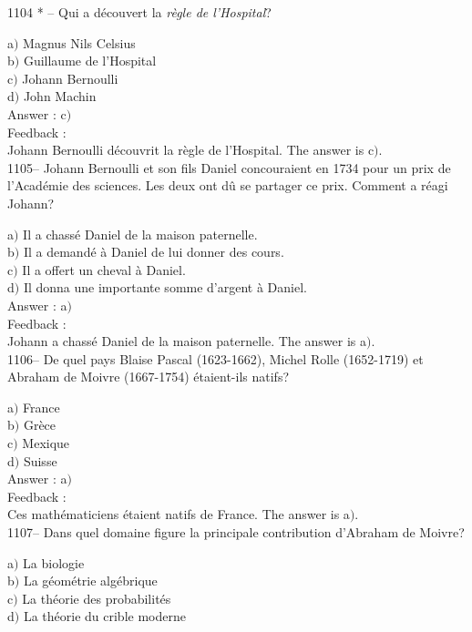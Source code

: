 ﻿\documentclass[letterpaper, 12pt]{article}
\begin{document}
1104 * -- Qui a d\'ecouvert la {\sl r\`egle de l'Hospital}?

a$)$ Magnus Nils Celsius \\
b$)$ Guillaume de l'Hospital \\
c$)$ Johann Bernoulli  \\
d$)$ John Machin  \\

Answer : c$)$\\

Feedback : \\
Johann Bernoulli d\'ecouvrit la r\`egle de l'Hospital.
The answer is c$)$.\\

1105-- Johann Bernoulli et son fils Daniel concouraient en 1734 pour
un prix de l'Acad\'emie des sciences. Les deux ont d\^u se partager
ce prix. Comment a r\'eagi Johann?

a$)$ Il a chass\'e Daniel de la maison paternelle.  \\
b$)$ Il a demand\'e \`a Daniel de lui donner des cours. \\
c$)$ Il a offert un cheval \`a Daniel.  \\
d$)$ Il donna une importante somme d'argent \`a Daniel.  \\

Answer : a$)$\\

Feedback : \\
Johann a chass\'e Daniel de la maison paternelle.
The answer is a$)$.\\

1106-- De quel pays Blaise Pascal (1623-1662), Michel Rolle
(1652-1719) et Abraham de Moivre (1667-1754) \'etaient-ils natifs?

a$)$ France  \\
b$)$ Gr\`ece \\
c$)$ Mexique  \\
d$)$ Suisse \\

Answer : a$)$\\

Feedback :\\
Ces math\'ematiciens \'etaient natifs de France.
The answer is a$)$.\\

1107-- Dans quel domaine figure la principale contribution d'Abraham
de Moivre?

a$)$ La biologie  \\
b$)$ La g\'eom\'etrie alg\'ebrique \\
c$)$ La th\'eorie des probabilit\'es  \\
d$)$ La th\'eorie du crible moderne\\
\end{document}
